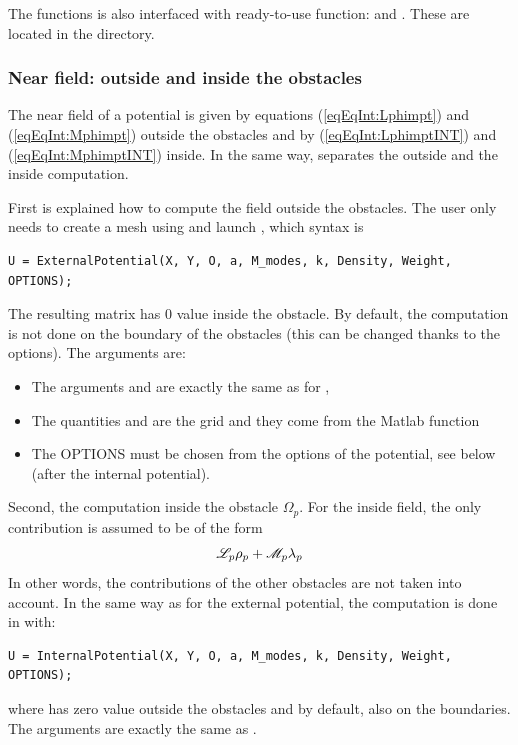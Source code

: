 \begin{remark}
The  functions is also interfaced with ready-to-use function:  and . These are located in the  directory.
\end{remark}


\subsubsection{Near field: outside and inside the obstacles}

The near field of a potential is given by equations (\ref{eqEqInt:Lphimpt}) and (\ref{eqEqInt:Mphimpt}) outside the obstacles and by (\ref{eqEqInt:LphimptINT}) and (\ref{eqEqInt:MphimptINT}) inside. In the same way, \mudiff separates the outside and the inside computation. 

First is explained how to compute the field outside the obstacles. The user only needs to create a mesh using \eg {} and launch , which syntax is
\begin{lstlisting}
U = ExternalPotential(X, Y, O, a, M_modes, k, Density, Weight, OPTIONS);
\end{lstlisting}
The resulting matrix  has $0$ value inside the obstacle. By default, the computation is not done on the boundary of the obstacles (this can be changed thanks to the options). The arguments are:
\begin{itemize}
\item The arguments  and  are exactly the same as for ,
\item The quantities  and  are the grid and they come from the Matlab  function
\item The OPTIONS must be chosen from the options of the potential, see below (after the internal potential).
\end{itemize}

Second, the computation inside the obstacle $\Omega_p$. For the inside field, the only contribution is assumed to be of the form 
$$
{\mathscr L}_p\rho_p + {\mathscr M}_p\lambda_p
$$
In other words, the contributions of the other obstacles are not taken into account. In the same way as for the external potential, the computation is done in \mudiff with:
\begin{lstlisting}
U = InternalPotential(X, Y, O, a, M_modes, k, Density, Weight, OPTIONS);
\end{lstlisting}
where  has zero value outside the obstacles and by default, also on the boundaries. The arguments are exactly the same as .

